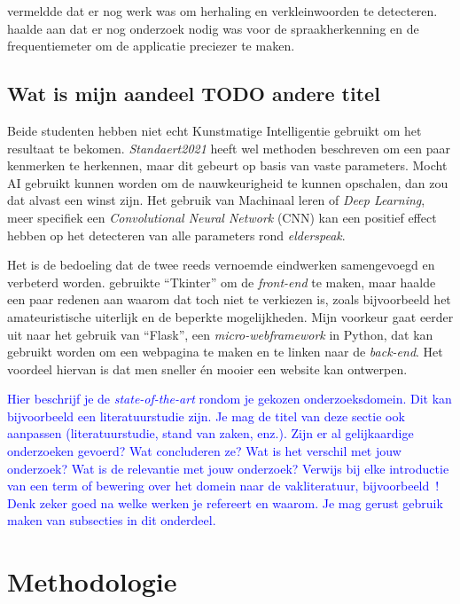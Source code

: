 \textcite{Beeckman2021} vermeldde dat er nog werk was om herhaling en verkleinwoorden te detecteren. \textcite{Standaert2021} haalde aan dat er nog onderzoek nodig was voor de spraakherkenning en de frequentiemeter om de applicatie preciezer te maken.

\subsection{Wat is mijn aandeel TODO andere titel}\label{subsec:watismijnadeel}

Beide studenten hebben niet echt Kunstmatige Intelligentie gebruikt om het resultaat te bekomen. \textit{Standaert2021} heeft wel methoden beschreven om een paar kenmerken te herkennen, maar dit gebeurt op basis van vaste parameters.
Mocht AI gebruikt kunnen worden om de nauwkeurigheid te kunnen opschalen, dan zou dat alvast een winst zijn.
Het gebruik van Machinaal leren of \textit{Deep Learning}, meer specifiek een \textit{Convolutional Neural Network} (CNN) kan een positief effect hebben op het detecteren van alle parameters rond \textit{elderspeak}.

Het is de bedoeling dat de twee reeds vernoemde eindwerken samengevoegd en verbeterd worden. \textcite{Beeckman2021} gebruikte ``Tkinter'' om de \textit{front-end} te maken, maar haalde een paar redenen aan waarom dat toch niet te verkiezen is, zoals bijvoorbeeld het amateuristische uiterlijk en de beperkte mogelijkheden.
Mijn voorkeur gaat eerder uit naar het gebruik van ``Flask'', een \textit{micro-webframework} in Python, dat kan gebruikt worden om een webpagina te maken en te linken naar de \textit{back-end}.
Het voordeel hiervan is dat men sneller én mooier een website kan ontwerpen.

\textcolor{blue}{
Hier beschrijf je de \emph{state-of-the-art} rondom je gekozen onderzoeksdomein. Dit kan bijvoorbeeld een literatuurstudie zijn. Je mag de titel van deze sectie ook aanpassen (literatuurstudie, stand van zaken, enz.). Zijn er al gelijkaardige onderzoeken gevoerd? Wat concluderen ze? Wat is het verschil met jouw onderzoek? Wat is de relevantie met jouw onderzoek?
Verwijs bij elke introductie van een term of bewering over het domein naar de vakliteratuur, bijvoorbeeld~\autocite{Doll1954}! Denk zeker goed na welke werken je refereert en waarom.
Je mag gerust gebruik maken van subsecties in dit onderdeel.}


\section{Methodologie}
\label{sec:methodologie}

